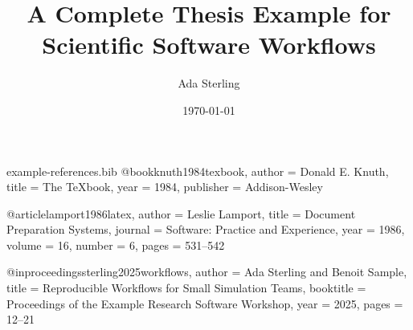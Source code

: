 \begin{filecontents*}[overwrite]{example-references.bib}
@book{knuth1984texbook,
  author    = {Donald E. Knuth},
  title     = {The TeXbook},
  year      = {1984},
  publisher = {Addison-Wesley}
}

@article{lamport1986latex,
  author  = {Leslie Lamport},
  title   = {Document Preparation Systems},
  journal = {Software: Practice and Experience},
  year    = {1986},
  volume  = {16},
  number  = {6},
  pages   = {531--542}
}

@inproceedings{sterling2025workflows,
  author    = {Ada Sterling and Benoit Sample},
  title     = {Reproducible Workflows for Small Simulation Teams},
  booktitle = {Proceedings of the Example Research Software Workshop},
  year      = {2025},
  pages     = {12--21}
}
\end{filecontents*}

\providecommand{\oritoneexamplemode}{white}
\documentclass[english,\oritoneexamplemode,bibtex]{oritone-thesis}

\title{A Complete Thesis Example for Scientific Software Workflows}
\author{Ada Sterling}
\date{\today}

\universityLogoWidth{7cm}


\frontmatter
\maketitle

\abstractChapter
This example demonstrates the thesis class with realistic front matter,
chapter headings, equations, figures, subfigures, tables, listings, plots,
cross-references, bibliography output, and a declaration page. The topic is a
small scientific software workflow because it naturally exercises mathematical
notation, implementation detail, and experimental reporting.

The text is intentionally longer than a minimal example. Filled pages make it
easier to evaluate margins, running heads, page numbers, caption spacing,
chapter starts, and the balance between the Oritone color layer and standard
black-on-white thesis pages.

